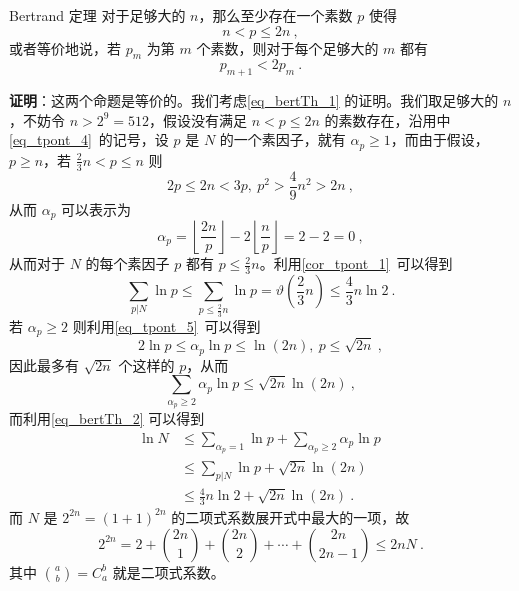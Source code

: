 

\begin{theorem}{Bertrand 定理}
对于足够大的 $n$，那么至少存在一个素数 $p$ 使得
\begin{equation}\label{eq_bertTh_1}
n < p \le 2n ~,
\end{equation}
或者等价地说，若 $p_m$ 为第 $m$ 个素数，则对于每个足够大的 $m$ 都有
\begin{equation}
p_{m+1} < 2 p_m ~.
\end{equation}

\end{theorem}

\textbf{证明}：这两个命题是等价的。我们考虑\autoref{eq_bertTh_1} 的证明。我们取足够大的 $n$，不妨令 $n > 2^9 = 512$，假设没有满足 $n < p \le 2n$ 的素数存在，沿用中\autoref{eq_tpont_4}~的记号，设 $p$ 是 $N$ 的一个素因子，就有 $\alpha_p \ge 1$，而由于假设，$p \ge n$，若 $\frac 23 n < p \le n$ 则
\begin{equation}
2p \le 2n < 3p, ~ p^2  > \frac 49 n^2 > 2n~,
\end{equation}
从而 $\alpha_p$ 可以表示为
\begin{equation}
\alpha_p = \left\lfloor \frac{2n}p \right\rfloor - 2 \left \lfloor \frac np \right \rfloor = 2 - 2 = 0 ~,
\end{equation}
从而对于 $N$ 的每个素因子 $p$ 都有 $p \le \frac23 n$。利用\autoref{cor_tpont_1}~可以得到
\begin{equation}\label{eq_bertTh_2}
\sum_{p | N} \ln p \le \sum_{p\le \frac 23 n} \ln p = \vartheta(\frac 23 n) \le \frac 43 n \ln 2 ~.
\end{equation}
若 $\alpha_p \ge 2$ 则利用\autoref{eq_tpont_5}~可以得到
\begin{equation}
2 \ln p \le \alpha_p \ln p \le \ln (2n), ~ p \le \sqrt{2n } ~,
\end{equation}
因此最多有 $\sqrt{2n}$ 个这样的 $p$，从而
\begin{equation}
\sum_{\alpha_p \ge 2} \alpha_p \ln p \le \sqrt{2n} \ln(2n) ~,
\end{equation}
而利用\autoref{eq_bertTh_2} 可以得到
\begin{equation}\label{eq_bertTh_3}
\begin{aligned}
\ln N &\le \sum_{\alpha_p = 1} \ln p + \sum_{\alpha_p \ge 2} \alpha_p \ln p ~\\
& \le \sum_{p | N} \ln p + \sqrt{2n} \ln(2n) ~\\
& \le \frac43 n \ln 2 + \sqrt{2n} \ln(2n) ~.
\end{aligned}
\end{equation}
而 $N$ 是 $2^{2n} = (1+1)^{2n}$ 的二项式系数展开式中最大的一项，故
\begin{equation}\label{eq_bertTh_4}
2^{2n} = 2 + \binom{2n}{1} + \binom{2n}{2} + \cdots + \binom{2n}{2n-1} \le 2nN ~.
\end{equation}
其中 $\binom{a}{b}  = C^b_a$ 就是二项式系数。

